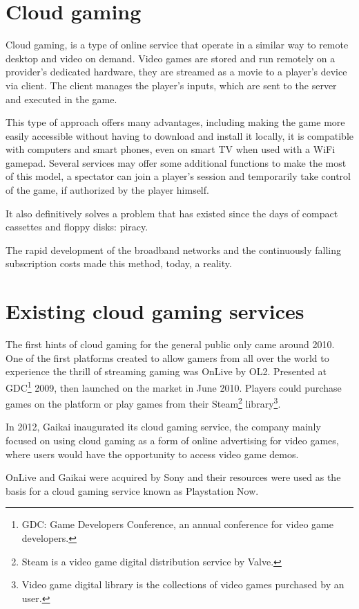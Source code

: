 \section{Cloud gaming}
Cloud gaming, is a type of online service that operate in a similar way to remote desktop and video on demand. Video games are stored and run remotely on a provider's dedicated hardware, they are streamed as a movie to a player's device via client. The client manages the player's inputs, which are sent to the server and executed in the game.

This type of approach offers many advantages, including making the game more easily accessible without having to download and install it locally, it is compatible with computers and smart phones, even on smart TV when used with a WiFi gamepad. Several services may offer some additional functions to make the most of this model, a spectator can join a player's session and temporarily take control of the game, if authorized by the player himself.

It also definitively solves a problem that has existed since the days of compact cassettes and floppy disks: piracy.

The rapid development of the broadband networks and the continuously falling subscription costs made this method, today, a reality.

\section{Existing cloud gaming services}
The first hints of cloud gaming for the general public only came around 2010. One of the first platforms created to allow gamers from all over the world to experience the thrill of streaming gaming was OnLive by OL2. Presented at GDC\footnote{GDC: Game Developers Conference, an annual conference for video game developers.} 2009, then launched on the market in June 2010. Players could purchase games on the platform or play games from their Steam\footnote{Steam is a video game digital distribution service by Valve.} library\footnote{Video game digital library is the collections of video games purchased by an user.}.

In 2012, Gaikai inaugurated its cloud gaming service, the company mainly focused on using cloud gaming as a form of online advertising for video games, where users would have the opportunity to access video game demos.

OnLive and Gaikai were acquired by Sony and their resources were used as the basis for a cloud gaming service known as Playstation Now.

